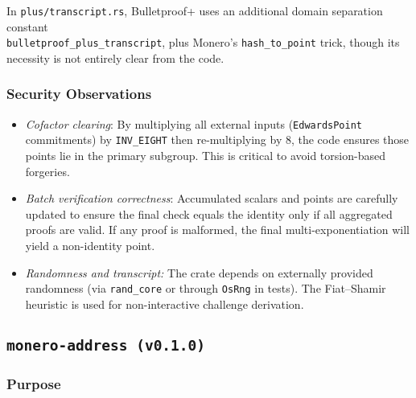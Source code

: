 In \texttt{plus/transcript.rs}, Bulletproof+ uses an additional domain separation constant \\
\verb|bulletproof_plus_transcript|, plus Monero's \texttt{hash\_to\_point} trick, though its necessity is not entirely clear from the code.  

\subsubsection{Security Observations}
\begin{itemize}
    \item \emph{Cofactor clearing}: By multiplying all external inputs (\texttt{EdwardsPoint} commitments) by \texttt{INV\_EIGHT} then re-multiplying by 8, the code ensures those points lie in the primary subgroup.  This is critical to avoid torsion-based forgeries. %
    \item \emph{Batch verification correctness}: Accumulated scalars and points are carefully updated to ensure the final check equals the identity only if all aggregated proofs are valid.  If any proof is malformed, the final multi-exponentiation will yield a non-identity point. %
    \item \emph{Randomness and transcript:} The crate depends on externally provided randomness (via \texttt{rand\_core} or through \texttt{OsRng} in tests).  The Fiat--Shamir heuristic is used for non-interactive challenge derivation. %
\end{itemize}


\subsection{\texttt{monero-address (v0.1.0)}}

\subsubsection{Purpose}

